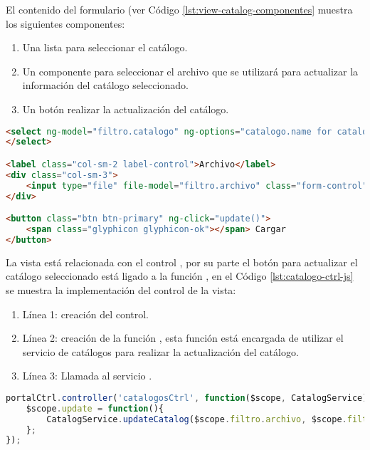 El contenido del formulario (ver Código \ref{lst:view-catalog-componentes} muestra los siguientes componentes:
\begin{enumerate}
	\item Una lista para seleccionar el catálogo.
	\item Un componente para seleccionar el archivo que se utilizará para actualizar la información del catálogo seleccionado.
	\item Un botón realizar la actualización del catálogo.
\end{enumerate}
\begin{lstlisting}[language=HTML, captionpos=b, caption={Componentes del formulario para seleccionar catálogo.}, label={lst:view-catalog-componentes}]
<select ng-model="filtro.catalogo" ng-options="catalogo.name for catalogo in catalogos" class="form-control">
</select>

<label class="col-sm-2 label-control">Archivo</label>
<div class="col-sm-3">
	<input type="file" file-model="filtro.archivo" class="form-control"/>
</div>

<button class="btn btn-primary" ng-click="update()">
	<span class="glyphicon glyphicon-ok"></span> Cargar
</button>
\end{lstlisting}

La vista está relacionada con el control , por su parte el botón para actualizar el catálogo seleccionado está ligado a la función , en el Código \ref{lst:catalogo-ctrl-js} se muestra la implementación del control de la vista:

\begin{enumerate}
	\item Línea 1: creación del control. 
	\item Línea 2: creación de la función , esta función está encargada de utilizar el servicio de catálogos para realizar la actualización del catálogo.
	\item Línea 3: Llamada al servicio .
\end{enumerate}

\begin{lstlisting}[language=Javascript, caption={Controlador de la vista Catálogo.}, captionpos=b, label={lst:catalogo-ctrl-js}]
portalCtrl.controller('catalogosCtrl', function($scope, CatalogService){
	$scope.update = function(){
		CatalogService.updateCatalog($scope.filtro.archivo, $scope.filtro.catalogo.name);
	};
});

\end{lstlisting}


